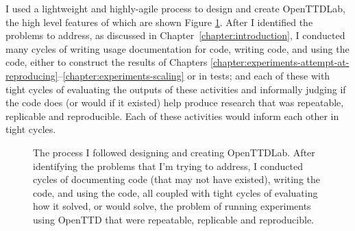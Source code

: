 \documentclass[logo,msc,dsti]{style/infthesis}    %
\begin{document}
{I used a lightweight and highly-agile process to design and create OpenTTDLab, the high level features of which are shown Figure \ref{fig:solo-agile}. After I identified the problems to address, as discussed in Chapter~\ref{chapter:introduction}, I conducted many cycles of writing usage documentation for code, writing code, and using the code, either to construct the results of Chapters \ref{chapter:experiments-attempt-at-reproducing}--\ref{chapter:experiments-scaling} or in tests; and each of these with tight cycles of evaluating the outputs of these activities and informally judging if the code does (or would if it existed) help produce research that was repeatable, replicable and reproducible. Each of these activities would inform each other in tight cycles.

\begin{figure}[ht]
\centering
{}
\caption{The process I followed designing and creating OpenTTDLab. After identifying the problems that I'm trying to address, I conducted cycles of documenting code (that may not have existed), writing the code, and using the code, all coupled with tight cycles of evaluating how it solved, or would solve, the problem of running experiments using OpenTTD that were repeatable, replicable and reproducible.}
\label{fig:solo-agile}
\end{figure}

}
\end{document}

